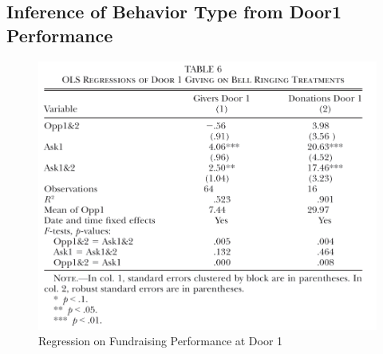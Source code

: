 \documentclass[../root]{subfiles}
\begin{document}
    \subsection{Inference of Behavior Type from Door1 Performance}

    \begin{figure}[t]
        \centering
        \includegraphics[width = .8\linewidth]{0821kato/fig7_1.png}
        \caption{Regression on Fundraising Performance at Door 1}
        \label{}
    \end{figure}
\end{document}
